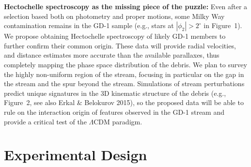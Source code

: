 \documentclass[12pt]{article}
\begin{document}
{\bf Hectochelle spectroscopy as the missing piece of the puzzle:}
Even after a selection based both on photometry and proper motions, some Milky Way contamination remains in the GD-1 sample (e.g., stars at $|\phi_2|>2^\circ$ in Figure~1).
We propose obtaining Hectochelle spectroscopy of likely GD-1 members to further confirm their common origin.
These data will provide radial velocities, and distance estimates more accurate than the available parallaxes, thus completely mapping the phase space distribution of the debris.
We plan to survey the highly non-uniform region of the stream, focusing in particular on the gap in the stream and the spur beyond the stream.
Simulations of stream perturbations predict unique signatures in the 3D kinematic structure of the debris (e.g., Figure~2, see also Erkal \& Belokurov 2015), so the proposed data will be able to rule on the interaction origin of features observed in the GD-1 stream and provide a critical test of the $\Lambda$CDM paradigm.



\pagebreak
\section*{Experimental Design}\vskip-0.2in

\end{document}
